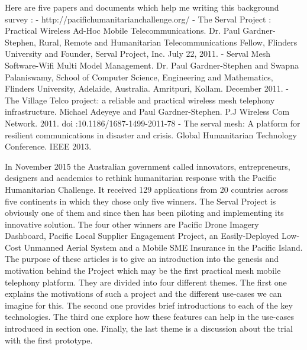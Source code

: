 \documentclass[a4paper, 11pt, oneside]{Thesis}  %
\begin{document}
Here are five papers and documents which help me writing this background survey :
- http://pacifichumanitarianchallenge.org/ 
- The Serval Project : Practical Wireless Ad-Hoc Mobile Telecommunications. Dr. Paul Gardner-Stephen, Rural, Remote and Humanitarian Telecommunications Fellow, Flinders University and Founder, Serval Project, Inc. July 22, 2011.
- Serval Mesh Software-Wifi Multi Model Management. Dr. Paul Gardner-Stephen and Swapna Palaniswamy, School of Computer Science, Engineering and Mathematics, Flinders University, Adelaide, Australia. Amritpuri, Kollam. December 2011. 
- The Village Telco project: a reliable and practical wireless mesh telephony infrastructure. Michael Adeyeye and Paul Gardner-Stephen. P.J Wireless Com Network. 2011. doi :10.1186/1687-1499-2011-78
- The serval mesh: A platform for resilient communications in disaster and crisis. Global Humanitarian Technology Conference. IEEE 2013.

In November 2015 the Australian government called innovators, entrepreneurs, designers and academics to rethink humanitarian response with the Pacific Humanitarian Challenge. It received 129 applications from 20 countries across five continents in which they chose only five winners. The Serval Project is obviously one of them and since then has been piloting and implementing its innovative solution. The four other winners are Pacific Drone Imagery Dashboard, Pacific Local Supplier Engagement Project, an Easily-Deployed Low-Cost Unmanned Aerial System and a Mobile SME Insurance in the Pacific Island. 
 \\

The purpose of these articles is to give an introduction into the genesis and motivation behind the Project which may be the first practical mesh mobile telephony platform.  They are divided into four different themes. The first one explains the motivations of such a project and the different use-cases we can imagine for this. The second one provides brief introductions to each of the key technologies. The third one explore how these features can help in the use-cases introduced in section one. Finally, the last theme is a discussion about the trial with the first prototype. \par
\end{document}
